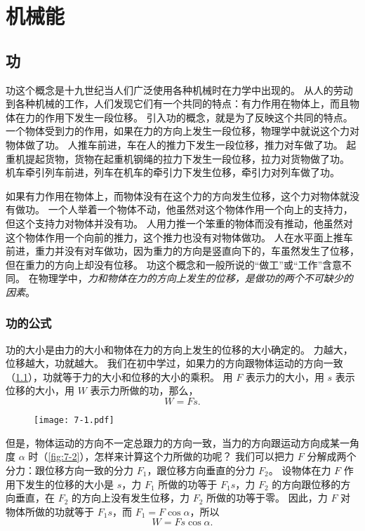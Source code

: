 \chapter{机械能}
\section{功}
功这个概念是十九世纪当人们广泛使用各种机械时在力学中出现的。
从人的劳动到各种机械的工作，人们发现它们有一个共同的特点：有力作用在物体上，而且物体在力的作用下发生一段位移。
引入功的概念，就是为了反映这个共同的特点。
一个物体受到力的作用，如果在力的方向上发生一段位移，物理学中就说这个力对物体做了功。
人推车前进，车在人的推力下发生一段位移，推力对车做了功。
起重机提起货物，货物在起重机钢绳的拉力下发生一段位移，拉力对货物做了功。
机车牵引列车前进，列车在机车的牵引力下发生位移，牵引力对列车做了功。

如果有力作用在物体上，而物体没有在这个力的方向发生位移，这个力对物体就没有做功。
一个人举着一个物体不动，他虽然对这个物体作用一个向上的支持力，但这个支持力对物体并没有功。
人用力推一个笨重的物体而没有推动，他虽然对这个物体作用一个向前的推力，这个推力也没有对物体做功。
人在水平面上推车前进，重力并没有对车做功，因为重力的方向是竖直向下的，车虽然发生了位移，但在重力的方向上却没有位移。
功这个概念和一般所说的“做工”或“工作”含意不同。
在物理学中，\emph{力和物体在力的方向上发生的位移，是做功的两个不可缺少的因素}。

\subsection{功的公式} 
功的大小是由力的大小和物体在力的方向上发生的位移的大小确定的。
力越大，位移越大，功就越大。
我们在初中学过，如果力的方向跟物体运动的方向一致（\cref{fig:7-1}），功就等于力的大小和位移的大小的乘积。
用 $F$ 表示力的大小，用 $s$ 表示位移的大小，用 $W$ 表示力所做的功，那么，
\[W=Fs.\]

\begin{figure}
  \texttt{[image: 7-1.pdf]}
  \caption{}\label{fig:7-1}
\end{figure}

但是，物体运动的方向不一定总跟力的方向一致，当力的方向跟运动方向成某一角度 $\alpha$ 时（\cref{fig:7-2}），怎样来计算这个力所做的功呢？
我们可以把力 $F$ 分解成两个分力：跟位移方向一致的分力 $F_1$，跟位移方向垂直的分力 $F_2$。
设物体在力 $F$ 作用下发生的位移的大小是 $s$，力 $F_1$ 所做的功等于 $F_1s$，力 $F_2$ 的方向跟位移的方向垂直，在 $F_2$ 的方向上没有发生位移，力 $F_2$ 所做的功等于零。
因此，力 $F$ 对物体所做的功就等于 $F_1s$，而 $F_1=F\cos\alpha$，所以
\[W=Fs\cos\alpha.\]

